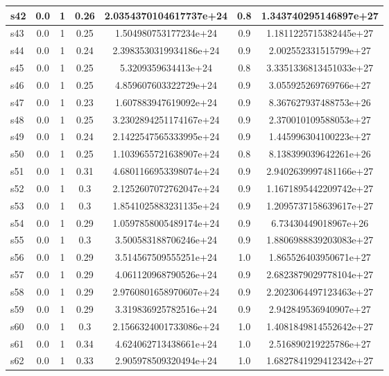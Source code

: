 \documentclass{article}
\begin{document}
\begin{tabular}{|l|c|c|c|c|c|c|}
\hline
s42 &0.0 & 1 & 0.26 & 2.0354370104617737e+24 & 0.8 & 1.343740295146897e+27\\
\hline
s43 &0.0 & 1 & 0.25 & 1.504980753177234e+24 & 0.9 & 1.1811225715382445e+27\\
\hline
s44 &0.0 & 1 & 0.24 & 2.3983530319934186e+24 & 0.9 & 2.002552331515799e+27\\
\hline
s45 &0.0 & 1 & 0.25 & 5.3209359634413e+24 & 0.8 & 3.3351336813451033e+27\\
\hline
s46 &0.0 & 1 & 0.25 & 4.859607603322729e+24 & 0.9 & 3.055925269769766e+27\\
\hline
s47 &0.0 & 1 & 0.23 & 1.607883947619092e+24 & 0.9 & 8.367627937488753e+26\\
\hline
s48 &0.0 & 1 & 0.25 & 3.2302894251174167e+24 & 0.9 & 2.370010109588053e+27\\
\hline
s49 &0.0 & 1 & 0.24 & 2.1422547565333995e+24 & 0.9 & 1.445996304100223e+27\\
\hline
s50 &0.0 & 1 & 0.25 & 1.1039655721638907e+24 & 0.8 & 8.138399039642261e+26\\
\hline
s51 &0.0 & 1 & 0.31 & 4.6801166953398074e+24 & 0.9 & 2.9402639997481166e+27\\
\hline
s52 &0.0 & 1 & 0.3 & 2.1252607072762047e+24 & 0.9 & 1.1671895442209742e+27\\
\hline
s53 &0.0 & 1 & 0.3 & 1.8541025883231135e+24 & 0.9 & 1.2095737158639617e+27\\
\hline
s54 &0.0 & 1 & 0.29 & 1.0597858005489174e+24 & 0.9 & 6.73430449018967e+26\\
\hline
s55 &0.0 & 1 & 0.3 & 3.500583188706246e+24 & 0.9 & 1.8806988839203083e+27\\
\hline
s56 &0.0 & 1 & 0.29 & 3.514567509555251e+24 & 1.0 & 1.865526403950671e+27\\
\hline
s57 &0.0 & 1 & 0.29 & 4.061120968790526e+24 & 0.9 & 2.6823879029778104e+27\\
\hline
s58 &0.0 & 1 & 0.29 & 2.9760801658970607e+24 & 0.9 & 2.2023064497123463e+27\\
\hline
s59 &0.0 & 1 & 0.29 & 3.319836925782516e+24 & 0.9 & 2.942849536940907e+27\\
\hline
s60 &0.0 & 1 & 0.3 & 2.1566324001733086e+24 & 1.0 & 1.4081849814552642e+27\\
\hline
s61 &0.0 & 1 & 0.34 & 4.624062713438661e+24 & 1.0 & 2.516890219225786e+27\\
\hline
s62 &0.0 & 1 & 0.33 & 2.905978509320494e+24 & 1.0 & 1.6827841929412342e+27\\
\hline

\end{tabular}
\end{document}

